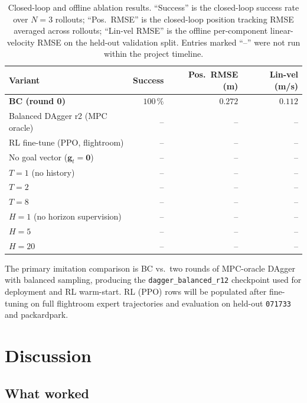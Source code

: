 \documentclass[10pt,twocolumn,letterpaper]{article}
\begin{document}
\begin{table}[t]
\centering
\caption{Closed-loop and offline ablation results. ``Success'' is the closed-loop success rate over $N{=}3$ rollouts; ``Pos.\ RMSE'' is the closed-loop position tracking RMSE averaged across rollouts; ``Lin-vel RMSE'' is the offline per-component linear-velocity RMSE on the held-out validation split. Entries marked ``--'' were not run within the project timeline.}
\label{tab:ablation}
\small
\begin{tabular}{@{}lrrr@{}}
\toprule
Variant & Success & Pos.\ RMSE (m) & Lin-vel (m/s) \\
\midrule
\textbf{BC (round 0)}            & $100\,\%$ & $0.272$ & $0.112$ \\
Balanced DAgger r2 (MPC oracle)  & --        & --      & --      \\
RL fine-tune (PPO, flightroom)   & --        & --      & --      \\
\midrule
No goal vector ($\mathbf{g}_t{=}\mathbf{0}$) & -- & -- & -- \\
\midrule
$T{=}1$ (no history)                          & -- & -- & -- \\
$T{=}2$                                       & -- & -- & -- \\
$T{=}8$                                       & -- & -- & -- \\
\midrule
$H{=}1$ (no horizon supervision)              & -- & -- & -- \\
$H{=}5$                                       & -- & -- & -- \\
$H{=}20$                                      & -- & -- & -- \\
\bottomrule
\end{tabular}
\end{table}

The primary imitation comparison is BC vs.\ two rounds of MPC-oracle DAgger with balanced sampling, producing the \texttt{dagger\_balanced\_r12} checkpoint used for deployment and RL warm-start. RL (PPO) rows will be populated after fine-tuning on full flightroom expert trajectories and evaluation on held-out \texttt{071733} and packardpark.

\section{Discussion}
\label{sec:discussion}

\subsection{What worked}
\end{document}
